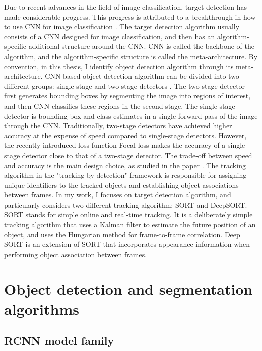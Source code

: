 Due to recent advances in the field of image classification, target detection has made considerable progress. This progress is attributed to a breakthrough in how to use CNN for image classification \cite{10.1145/3065386}. The target detection algorithm usually consists of a CNN designed for image classification, and then has an algorithm-specific additional structure around the CNN. CNN is called the backbone of the algorithm, and the algorithm-specific structure is called the meta-architecture. By convention, in this thesis, I identify object detection algorithm through its meta-architecture. CNN-based object detection algorithm can be divided into two different groups: single-stage and two-stage detectors \cite{DBLP:journals/corr/abs-1808-07256}. The two-stage detector first generates bounding boxes by segmenting the image into regions of interest, and then CNN classifies these regions in the second stage. The single-stage detector is bounding box and class estimates in a single forward pass of the image through the CNN. Traditionally, two-stage detectors have achieved higher accuracy at the expense of speed compared to single-stage detectors. However, the recently introduced loss function Focal loss \cite{DBLP:journals/corr/abs-1708-02002} makes the accuracy of a single-stage detector close to that of a two-stage detector. The trade-off between speed and accuracy is the main design choice, as studied in the paper \cite{DBLP:journals/corr/HuangRSZKFFWSG016}.
The tracking algorithm in the "tracking by detection" framework is responsible for assigning unique identifiers to the tracked objects and establishing object associations between frames. In my work, I focuses on target detection algorithm, and particularly considers two different tracking algorithm: SORT and DeepSORT. SORT stands for simple online and real-time tracking. It is a deliberately simple tracking algorithm that uses a Kalman filter \cite{10.1115/1.3662552} to estimate the future position of an object, and uses the Hungarian method \cite{doi:10.1002/nav.3800020109} for frame-to-frame correlation. Deep SORT is an extension of SORT that incorporates appearance information when performing object association between frames.
\section{Object detection and segmentation algorithms}
\subsection{RCNN model family}
